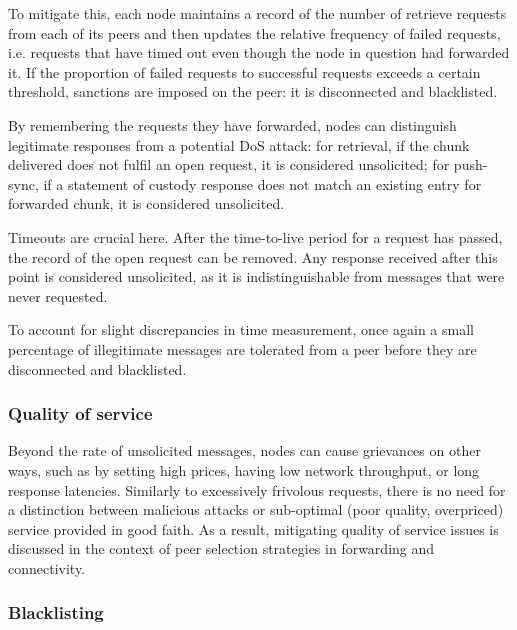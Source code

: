To mitigate this, each node maintains a record of the number of retrieve requests from each of its peers and then updates the relative frequency of failed requests, i.e. requests that have timed out even though the node in question had forwarded it. If the proportion of failed requests to successful requests exceeds a certain threshold, sanctions are imposed on the peer: it is disconnected and blacklisted.

% 
%

By remembering the requests they have forwarded, nodes can distinguish legitimate responses from a potential DoS attack: for retrieval, if the chunk delivered does not fulfil an open request, it is considered unsolicited; for push-sync, if a statement of custody response does not match an existing entry for forwarded chunk, it is considered unsolicited.

Timeouts are crucial here. After the time-to-live period for a request has passed, the record of the open request can be removed. Any response received after this point is considered unsolicited, as it is indistinguishable from messages that were never requested. 

To account for slight discrepancies in time measurement, once again a small percentage of illegitimate messages are tolerated from a peer before they are disconnected and blacklisted.

\subsubsection{Quality of service}

Beyond the rate of unsolicited messages, nodes can cause grievances on other ways, such as by setting high prices, having low network throughput, or long response latencies. Similarly to excessively frivolous requests, there is no need for a distinction between malicious attacks or sub-optimal (poor quality, overpriced) service provided in good faith. As a result, mitigating quality of service issues is discussed in the context of peer selection strategies in forwarding and connectivity.

\subsubsection{Blacklisting}


